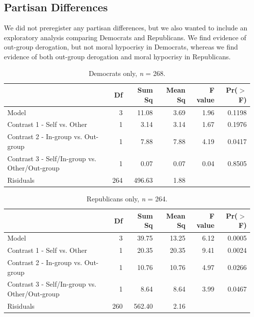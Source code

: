 \documentclass[12pt,]{article}
\begin{document}

\clearpage
\subsection{Partisan Differences}
\label{appendix:p_dif2}

We did not preregister any partisan differences, but we also wanted to include an exploratory analysis comparing Democrats and Republicans.  We find evidence of out-group derogation, but not moral hypocrisy in Democrats, whereas we find evidence of both out-group derogation and moral hypocrisy in Republicans. 

\vspace{0.6cm}

\begin{table}[ht]
\centering
\begin{tabular}{lrrrrr}
  \hline
 & Df & Sum Sq & Mean Sq & F value & Pr($>$F) \\ 
  \hline
Model & 3 & 11.08 & 3.69 & 1.96 & 0.1198 \\ 
  Contrast 1 - Self vs. Other & 1 & 3.14 & 3.14 & 1.67 & 0.1976 \\ 
  Contrast 2 - In-group vs. Out-group & 1 & 7.88 & 7.88 & 4.19 & 0.0417 \\ 
  Contrast 3 - Self/In-group vs. Other/Out-group & 1 & 0.07 & 0.07 & 0.04 & 0.8505 \\ 
  Risiduals & 264 & 496.63 & 1.88 &  &  \\ 
   \hline
\end{tabular}
\caption{Democrats only, \emph{n} = 268.} 
\label{dems2}
\end{table}

\vspace{0.6cm}

\begin{table}[ht]
\centering
\begin{tabular}{lrrrrr}
  \hline
 & Df & Sum Sq & Mean Sq & F value & Pr($>$F) \\ 
  \hline
Model & 3 & 39.75 & 13.25 & 6.12 & 0.0005 \\ 
  Contrast 1 - Self vs. Other & 1 & 20.35 & 20.35 & 9.41 & 0.0024 \\ 
  Contrast 2 - In-group vs. Out-group & 1 & 10.76 & 10.76 & 4.97 & 0.0266 \\ 
  Contrast 3 - Self/In-group vs. Other/Out-group & 1 & 8.64 & 8.64 & 3.99 & 0.0467 \\ 
  Risiduals & 260 & 562.40 & 2.16 &  &  \\ 
   \hline
\end{tabular}
\caption{Republicans only, \emph{n} = 264. } 
\label{reps2}
\end{table}
\end{document}
